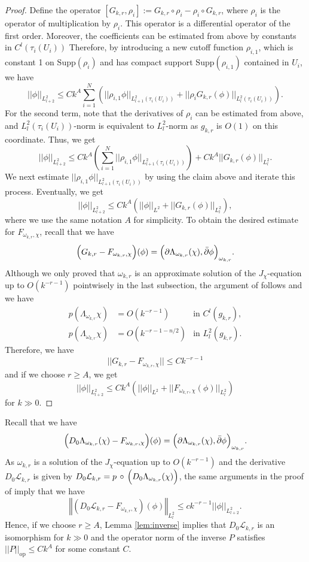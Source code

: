 \documentclass{amsart}
\numberwithin{equation}{section}
\theoremstyle{plain}
\theoremstyle{definition}
\theoremstyle{remark}
\begin{document}
\begin{proof}
Define the operator $[G_{k,r},\rho_i]:= G_{k,r} \circ \rho_i  -\rho_i \circ G_{k,r}$, where $\rho_i$ is the operator of multiplication by $\rho_i$. This operator is a differential operator of the first order. Moreover, the coefficients can be estimated from above by constants in $C^l(\tau_i(U_i))$
Therefore, by introducing a new cutoff function $\rho_{i,1}$, which is constant 1 on $\mathrm{Supp}(\rho_i)$ and has compact support $\mathrm{Supp}(\rho_{i,1})$ contained in $U_i$, we have
$$||\phi||_{L^2_{l+2}} \le C k^{A} \sum^N_{i=1} \left(||\rho_{i,1} \phi||_{L^2_{l+1}(\tau_i(U_i))} + ||\rho_i G_{k,r}(\phi)||_{L^2_{l}(\tau_i(U_i))} \right).$$
For the second term, note that the derivatives of $\rho_i$ can be estimated from above, and $L^2_l(\tau_i(U_i))$-norm is equivalent to $L^2_l$-norm as $g_{k,r}$ is $O(1)$ on this coordinate. Thus, we get
$$||\phi||_{L^2_{l+2}} \le C k^{A} \left(\sum^N_{i=1} ||\rho_{i,1} \phi||_{L^2_{l+1}(\tau_i(U_i))}\right) + C k^A ||G_{k,r}(\phi)||_{L^2_l}.$$
We next estimate $||\rho_{i,1} \phi||_{L^2_{l+1}(\tau_i(U_i))}$ by using the claim above and iterate this process. Eventually, we get
$$||\phi||_{L^2_{l+2}} \le C k^{A} \left(||\phi||_{L^2} + ||G_{k,r}(\phi)||_{L^2_l}\right),$$
where we use the same notation $A$ for simplicity.
To obtain the desired estimate for $F_{\omega_{k,r},\chi}$, recall that we have
$$\Bigl( G_{k,r} - F_{\omega_{k,r}, \chi} \Bigr)(\phi)
= \Bigl( \partial \Lambda_{\omega_{k,r}}(\chi), \bar{\partial}\phi \Bigr)_{\omega_{k,r}}.$$
Although we only proved that $\omega_{k,r}$ is an approximate solution of the $J_\chi$-equation up to $O(k^{-r-1})$ pointwisely in the last subsection, the argument of \cite[Lemma 5.7]{Fine} follows and we have
\begin{align*}
p(\Lambda_{\omega_{k,r}}\chi)&= O(k^{-r-1}) &\text{in $C^l(g_{k,r})$},\\
p(\Lambda_{\omega_{k,r}}\chi)&= O(k^{-r-1-n/2}) &\text{in $L^2_l(g_{k,r})$}.
\end{align*}
Therefore, we have
$$||G_{k,r}-F_{\omega_{k,r},\chi}|| \le C k^{-r-1}$$
and if we choose $r \ge A$, we get
$$||\phi||_{L^2_{l+2}} \le C k^{A} \left(||\phi||_{L^2} + ||F_{\omega_{k,r},\chi}(\phi)||_{L^2_l}\right)$$
for $k \gg 0$. 
\end{proof}


Recall that we have 
$$\Bigl( D_0 \Lambda_{\omega_{k,r}}(\chi) - F_{\omega_{k,r}, \chi} \Bigr)(\phi)
= \Bigl( \partial \Lambda_{\omega_{k,r}}(\chi), \bar{\partial}\phi \Bigr)_{\omega_{k,r}}.$$
As $\omega_{k,r}$ is a solution of the $J_\chi$-equation up to $O \left( k^{-r-1} \right)$ and the derivative $D_0 \mathcal{L}_{k,r}$ is given by $D_0 \mathcal{L}_{k,r} = p \, \circ \, \Bigl( D_0 \Lambda_{\omega_{k,r}}(\chi) \Bigr)$, the same arguments in the proof of \cite[Theorem 6.1] {Fine} imply that we have
$$ \left\Vert \left( D_0 \mathcal{L}_{k,r} - F_{\omega_{k,r}, \chi} \right) (\phi)\right\Vert_{L^2_l}
\le c k^{-r-1} ||\phi||_{L^2_{l+2}}.$$
Hence, if we choose $r \ge A$, Lemma \ref{lem:inverse} implies that $D_0 \mathcal{L}_{k,r}$ is an isomorphism for $k\gg0$ and the operator norm of the inverse $P$ satisfies $||P||_\mathrm{op} \le C k^A$
for some constant $C$.
\end{document}
